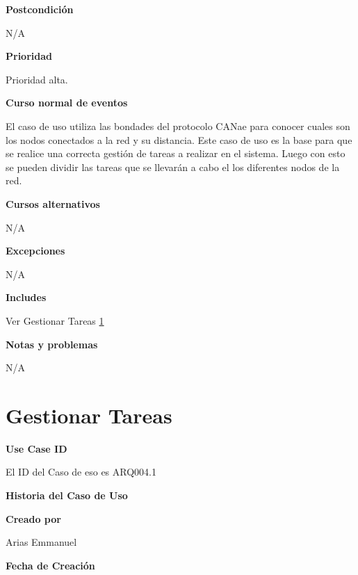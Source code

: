 \large\textbf{Postcondición}
\vspace{5mm}

N/A

\large\textbf{Prioridad}
\vspace{3mm}

Prioridad alta.

\large\textbf{Curso normal de eventos}
\vspace{3mm}

El caso de uso utiliza las bondades del protocolo CANae para conocer
cuales son los nodos conectados a la red y su distancia. Este caso
de uso es la base para que se realice una correcta gestión de tareas
a realizar en el sistema. Luego con esto se pueden dividir las tareas que
se llevarán a cabo el los diferentes nodos de la red. 

\large\textbf{Cursos alternativos}
\vspace{3mm}

N/A

\large\textbf{Excepciones}
\vspace{3mm}

N/A

\large\textbf{Includes}
\vspace{3mm}

Ver Gestionar Tareas \ref{uc:GestionarTareas}

\large\textbf{Notas y problemas}
\vspace{3mm}

N/A



\section{Gestionar Tareas}\label{uc:GestionarTareas}

\large\textbf{Use Case ID}
\vspace{3mm}

El ID del Caso de eso es ARQ004.1

\Large\textbf{Historia del Caso de Uso}
\vspace{3mm}

\large\textbf{Creado por}
\vspace{3mm}

Arias Emmanuel

\large\textbf{Fecha de Creación}
\vspace{3mm}

